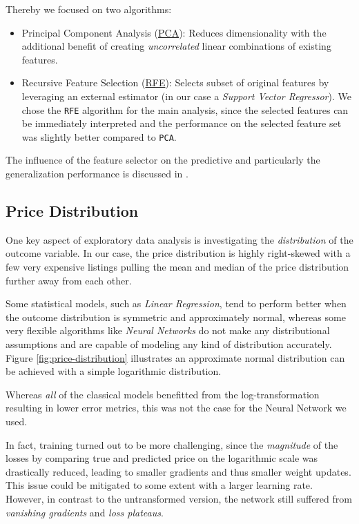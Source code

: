 Thereby we focused on two algorithms:
\begin{itemize}
  \item Principal Component Analysis (\href{https://scikit-learn.org/stable/modules/generated/sklearn.decomposition.PCA.html}{PCA}):
        Reduces dimensionality with the additional benefit of creating \emph{uncorrelated} linear combinations of existing features.
  \item Recursive Feature Selection (\href{https://scikit-learn.org/stable/modules/generated/sklearn.feature_selection.RFE.html}{RFE}):
        Selects subset of original features by leveraging an external estimator (in our case a \emph{Support Vector Regressor}).
        We chose the \texttt{RFE} algorithm for the main analysis, since the selected features can be immediately interpreted and the performance on the selected feature set was slightly better compared to \texttt{PCA}.

\end{itemize}

The influence of the feature selector on the predictive and particularly the generalization performance is discussed in .

\subsection{Price Distribution} \label{appendix:price-distribution}

One key aspect of exploratory data analysis is investigating the \emph{distribution} of the outcome variable.
In our case, the price distribution is highly right-skewed with a few very expensive listings pulling the mean and median of the price distribution further away from each other.

Some statistical models, such as \emph{Linear Regression}, tend to perform better when the outcome distribution is symmetric and approximately normal, whereas some very flexible algorithms like \emph{Neural Networks} do not make any distributional assumptions and are capable of modeling any kind of distribution accurately.
Figure \ref{fig:price-distribution} illustrates an approximate normal distribution can be achieved with a simple logarithmic distribution.

Whereas \emph{all} of the classical models benefitted from the log-transformation resulting in lower error metrics, this was not the case for the Neural Network we used.

In fact, training turned out to be more challenging, since the \emph{magnitude} of the losses by comparing true and predicted price on the logarithmic scale was drastically reduced, leading to smaller gradients and thus smaller weight updates.
This issue could be mitigated to some extent with a larger learning rate.
However, in contrast to the untransformed version, the network still suffered from \emph{vanishing gradients} and \emph{loss plateaus}.

